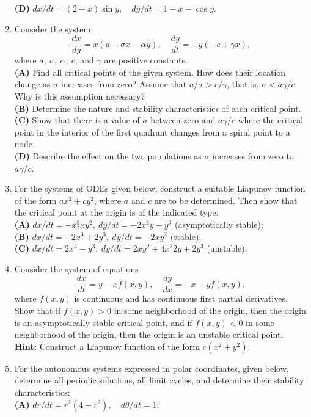 \documentclass[11pt,a4paper]{article}
\begin{document}
\begin{enumerate}
		\textbf{(D)} $dx/dt = (2 + x) \sin y,\quad dy/dt = 1 - x - \cos y$.
		\item Consider the system
		$$
		\frac{dx}{dy} = x(a - \sigma x - \alpha y),\quad \frac{dy}{dt} = -y(-c + \gamma x),
		$$
		where $a,\ \sigma,\ \alpha,\ c$, and $\gamma$ are positive constants.\\
		\textbf{(A)} Find all critical points of the given system. How does their location change as $\sigma$ increases from zero? Assume that $a/\sigma > c/\gamma$, that is, $\sigma < a\gamma/c$. Why is this assumption necessary?\\
		\textbf{(B)} Determine the nature and stability characteristics of each critical point.\\
		\textbf{(C)} Show that there is a value of $\sigma$ between zero and $a\gamma /c$ where the critical point in the interior of the first quadrant changes from a spiral point to a node.\\
		\textbf{(D)} Describe the effect on the two populations as $\sigma$ increases from zero to $a\gamma /c$.
		\item For the systems of ODEs given below, construct a suitable Liapunov function of the form $ax^2 + cy^2$, where $a$ and $c$ are to be determined. Then show that the critical point at the origin is of the indicated type:\\
		\textbf{(A)} $dx/dt = -x^3_2xy^2,\ dy/dt = −2x^2y - y^3$ (asymptotically stable);\\
		\textbf{(B)} $dx/dt = -2x^3 + 2y^3,\ dy/dt = -2xy^2$ (stable);\\
		\textbf{(C)} $dx/dt = 2x^3 - y^3,\ dy/dt = 2xy^2 + 4x^2 2y + 2y^3$ (unstable).
		\item Consider the system of equations
		$$
		\frac{dx}{dt} = y - xf(x,y),\quad \frac{dy}{dx} = -x - yf(x,y),
		$$
		where $f(x, y)$ is continuous and has continuous first partial derivatives. Show that if $f(x, y) > 0$ in some neighborhood of the origin, then the origin is an asymptotically stable critical point, and if $f(x, y) < 0$ in some neighborhood of the origin, then the origin is an unstable critical point.\\
		\textbf{Hint:} Construct a Liapunov function of the form $c(x^2 + y^2)$.
		\item For the autonomous systems expressed in polar coordinates, given below, determine all periodic solutions, all limit cycles, and determine their stability characteristics:\\
		\textbf{(A)} $dr/dt = r^2(4-r^2),\quad d\theta/dt = 1$;\\

\end{enumerate}
\end{document}
